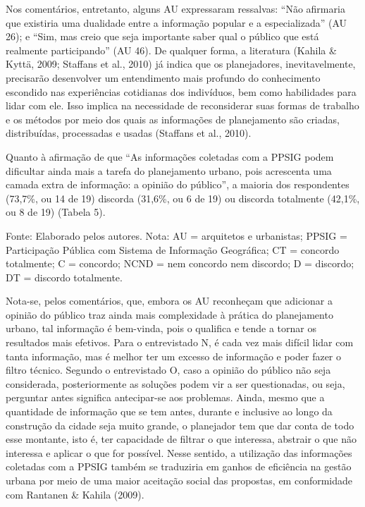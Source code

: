 \documentclass{article}
\begin{document}
\begin{multicols}{2}
Nos comentários, entretanto, alguns AU expressaram ressalvas: “Não
afirmaria que existiria uma dualidade entre a informação popular e a
especializada” (AU 26); e “Sim, mas creio que seja
importante saber qual o público que está realmente participando”
(AU 46). De qualquer forma, a literatura (Kahila \& Kyttä, 2009; Staffans
et al., 2010) já indica que os planejadores, inevitavelmente,
precisarão desenvolver um entendimento mais profundo do conhecimento escondido
nas experiências cotidianas dos indivíduos, bem como habilidades para lidar com
ele. Isso implica na necessidade de reconsiderar suas formas de trabalho e os
métodos por meio dos quais as informações de planejamento são criadas,
distribuídas, processadas e usadas (Staffans et
al., 2010).

Quanto à afirmação de que “As informações coletadas com a PPSIG podem
dificultar ainda mais a tarefa do planejamento urbano, pois acrescenta uma
camada extra de informação: a opinião do público”, a maioria dos
respondentes (73,7\%, ou 14 de 19) discorda (31,6\%, ou 6 de 19) ou discorda
totalmente (42,1\%, ou 8 de 19) (Tabela
5).

Fonte: Elaborado pelos autores. Nota: AU = arquitetos e urbanistas;
PPSIG = Participação Pública com Sistema de Informação Geográfica;
CT = concordo totalmente; C = concordo; NCND = nem concordo nem
discordo; D = discordo; DT = discordo totalmente.

Nota-se, pelos comentários, que, embora os AU reconheçam que adicionar a opinião
do público traz ainda mais complexidade à prática do planejamento urbano, tal
informação é bem-vinda, pois o qualifica e tende a tornar os resultados mais
efetivos. Para o entrevistado N, é cada vez mais difícil lidar com tanta
informação, mas é melhor ter um excesso de informação e poder fazer o filtro
técnico. Segundo o entrevistado O, caso a opinião do público não seja
considerada, posteriormente as soluções podem vir a ser questionadas, ou seja,
perguntar antes significa antecipar-se aos problemas. Ainda, mesmo que a
quantidade de informação que se tem antes, durante e inclusive ao longo da
construção da cidade seja muito grande, o planejador tem que dar conta de todo
esse montante, isto é, ter capacidade de filtrar o que interessa, abstrair o que
não interessa e aplicar o que for possível. Nesse sentido, a utilização das
informações coletadas com a PPSIG também se traduziria em ganhos de eficiência
na gestão urbana por meio de uma maior aceitação social das propostas, em
conformidade com Rantanen \& Kahila
(2009).


\end{multicols}
\end{document}
